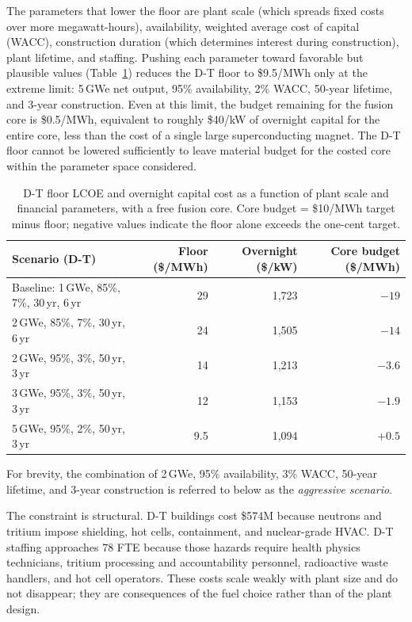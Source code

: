 \documentclass{article}
\begin{document}
The parameters that lower the floor are
plant scale (which spreads fixed costs over more megawatt-hours),
availability, weighted average cost of capital (WACC), construction
duration (which determines interest during construction), plant
lifetime, and staffing. Pushing each parameter toward favorable but
plausible values (Table~\ref{tab:dt-sweep}) reduces the D-T floor to
\$9.5/MWh only at the extreme limit: 5\,GWe net
output, 95\% availability, 2\% WACC, 50-year lifetime, and 3-year
construction. Even at this limit, the budget remaining for the
fusion core is \$0.5/MWh, equivalent to roughly \$40/kW of
overnight capital for the entire core, less than the cost of a
single large superconducting magnet. The D-T floor cannot be
lowered sufficiently to leave material budget for the costed core
within the parameter space considered.

\begin{table}[htbp]
\caption{D-T floor LCOE and overnight capital cost as a function of
plant scale and financial parameters, with a free fusion core. Core
budget = \$10/MWh target minus floor; negative values indicate the
floor alone exceeds the one-cent target.}
\label{tab:dt-sweep}
\centering
\begin{tabular}{lrrr}
\toprule
Scenario (D-T) & Floor (\$/MWh) & Overnight (\$/kW) & Core
budget (\$/MWh) \\
\midrule
Baseline: 1\,GWe, 85\%, 7\%, 30\,yr, 6\,yr & 29 & 1{,}723 & $-19$ \\
2\,GWe, 85\%, 7\%, 30\,yr, 6\,yr & 24 & 1{,}505 & $-14$ \\
2\,GWe, 95\%, 3\%, 50\,yr, 3\,yr & 14 & 1{,}213 & $-3.6$ \\
3\,GWe, 95\%, 3\%, 50\,yr, 3\,yr & 12 & 1{,}153 & $-1.9$ \\
5\,GWe, 95\%, 2\%, 50\,yr, 3\,yr & 9.5 & 1{,}094 & $+0.5$ \\
\bottomrule
\end{tabular}
\end{table}

For brevity, the combination of 2\,GWe, 95\% availability, 3\% WACC,
50-year lifetime, and 3-year construction is referred to below as
the \emph{aggressive scenario}.

The constraint is structural. D-T buildings cost \$574M because
neutrons and tritium impose shielding, hot cells, containment, and
nuclear-grade HVAC. D-T staffing approaches 78 FTE because those
hazards require health physics technicians, tritium processing and
accountability personnel, radioactive waste handlers, and hot cell
operators. These costs scale weakly with plant size and do not
disappear; they are consequences of the fuel choice rather than of
the plant design.
\end{document}
